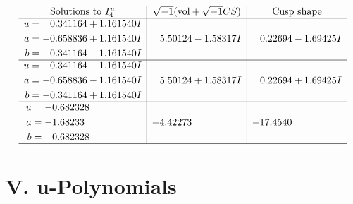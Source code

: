 \documentclass[1p]{elsarticle_modified}
\theoremstyle{definition}
\newcommand{\I}{\sqrt{-1}}
\begin{document}
$$\begin{array}{c|c|c}  
\text{Solutions to }I^u_{4}& \I (\text{vol} + \sqrt{-1}CS) & \text{Cusp shape}\\
 \hline 
\begin{aligned}
u &= \phantom{-}0.341164 + 1.161540 I \\
a &= -0.658836 + 1.161540 I \\
b &= -0.341164 - 1.161540 I\end{aligned}
 & \phantom{-}5.50124 - 1.58317 I & \phantom{-}0.22694 - 1.69425 I \\ \hline\begin{aligned}
u &= \phantom{-}0.341164 - 1.161540 I \\
a &= -0.658836 - 1.161540 I \\
b &= -0.341164 + 1.161540 I\end{aligned}
 & \phantom{-}5.50124 + 1.58317 I & \phantom{-}0.22694 + 1.69425 I \\ \hline\begin{aligned}
u &= -0.682328\phantom{ +0.000000I} \\
a &= -1.68233\phantom{ +0.000000I} \\
b &= \phantom{-}0.682328\phantom{ +0.000000I}\end{aligned}
 & -4.42273\phantom{ +0.000000I} & -17.4540\phantom{ +0.000000I}\\
 \hline 
 \end{array}$$\newpage
\newpage\renewcommand{\arraystretch}{1}
\centering \section*{ V. u-Polynomials}
\end{document}
